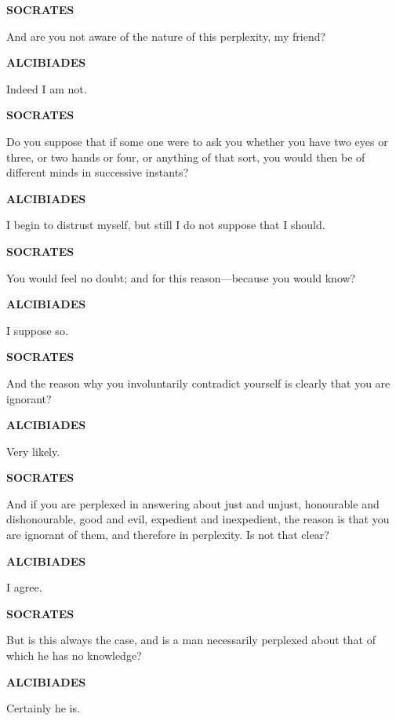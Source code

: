 \documentclass[11pt,letter]{article}
\begin{document}
\par \textbf{SOCRATES}
\par   And are you not aware of the nature of this perplexity, my friend?

\par \textbf{ALCIBIADES}
\par   Indeed I am not.

\par \textbf{SOCRATES}
\par   Do you suppose that if some one were to ask you whether you have two eyes or three, or two hands or four, or anything of that sort, you would then be of different minds in successive instants?

\par \textbf{ALCIBIADES}
\par   I begin to distrust myself, but still I do not suppose that I should.

\par \textbf{SOCRATES}
\par   You would feel no doubt; and for this reason—because you would know?

\par \textbf{ALCIBIADES}
\par   I suppose so.

\par \textbf{SOCRATES}
\par   And the reason why you involuntarily contradict yourself is clearly that you are ignorant?

\par \textbf{ALCIBIADES}
\par   Very likely.

\par \textbf{SOCRATES}
\par   And if you are perplexed in answering about just and unjust, honourable and dishonourable, good and evil, expedient and inexpedient, the reason is that you are ignorant of them, and therefore in perplexity. Is not that clear?

\par \textbf{ALCIBIADES}
\par   I agree.

\par \textbf{SOCRATES}
\par   But is this always the case, and is a man necessarily perplexed about that of which he has no knowledge?

\par \textbf{ALCIBIADES}
\par   Certainly he is.
\end{document}
